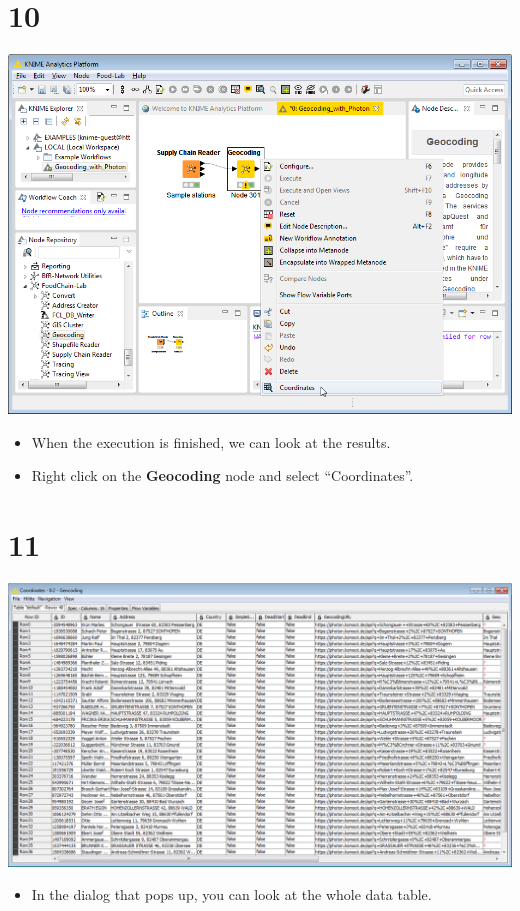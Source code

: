 \documentclass[10pt]{beamer}
\begin{document}
\section{10}
\begin{frame}
	\begin{center}
  		\includegraphics[height=0.6\textheight]{10.png}
	\end{center}
	\begin{itemize}
		\item When the execution is finished, we can look at the results.
		\item Right click on the \textbf{Geocoding} node and select ``Coordinates''.
	\end{itemize}
\end{frame}

\section{11}
\begin{frame}
	\begin{center}
  		\includegraphics[height=0.6\textheight]{11.png}
	\end{center}
	\begin{itemize}
		\item In the dialog that pops up, you can look at the whole data table.
	\end{itemize}
\end{frame}
\end{document}
